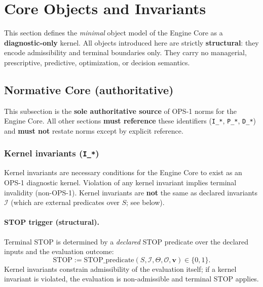 ﻿\section{Core Objects and Invariants}

This section defines the \emph{minimal} object model of the Engine Core as a    
\textbf{diagnostic-only} kernel. All objects introduced here are strictly       
\textbf{structural}: they encode admissibility and terminal boundaries only.    
They carry no managerial, prescriptive, predictive, optimization, or decision   
semantics.

\subsection{Normative Core (authoritative)}

This subsection is the \textbf{sole authoritative source} of OPS-1 norms for the
Engine Core. All other sections \textbf{must reference} these identifiers
(\texttt{I\_*}, \texttt{P\_*}, \texttt{D\_*}) and \textbf{must not} restate norms
except by explicit reference.

\subsubsection{Kernel invariants (\texttt{I\_*})}

Kernel invariants are necessary conditions for the Engine Core to exist as an
OPS-1 diagnostic kernel. Violation of any kernel invariant implies terminal
invalidity (non-OPS-1). Kernel invariants are \textbf{not} the same as declared
invariants $\mathcal{I}$ (which are external predicates over $S$; see below).

\paragraph{STOP trigger (structural).}
Terminal STOP is determined by a \emph{declared} STOP predicate over the declared
inputs and the evaluation outcome:
\[
\mathrm{STOP} := \mathrm{STOP\_predicate}(S,\mathcal{I},\Theta,\mathcal{O},\mathbf{v}) \in \{0,1\}.
\]
Kernel invariants constrain admissibility of the evaluation itself; if a kernel
invariant is violated, the evaluation is non-admissible and terminal STOP applies.

